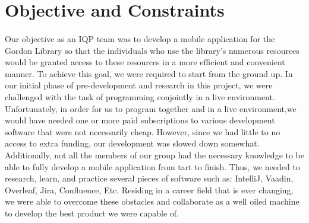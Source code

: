 \section{Objective and Constraints}
    \paragraph{}
        Our objective as an IQP team was to develop a mobile application for the Gordon Library so that the individuals who use the library's numerous resources would be granted access to these resources in a more efficient and convenient manner. To achieve this goal, we were required to start from the ground up. In our initial phase of pre-development and research in this project, we were challenged with the task of programming conjointly in a live environment. Unfortunately, in order for us to program together and in a live environment,we would have needed one or more paid subscriptions to various development software that were not necessarily cheap. However, since we had little to no access to extra funding, our development was slowed down somewhat. Additionally, not all the members of our group had the necessary knowledge to be able to fully develop a mobile application from tart to finish. Thus, we needed to research, learn, and practice several pieces of software such as: IntelliJ, Vaadin, Overleaf, Jira, Confluence, Etc. Residing in a career field that is ever changing, we were able to overcome these obstacles and collaborate as a well oiled machine to develop the best product we were capable of.